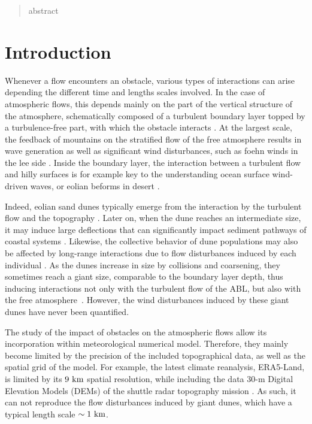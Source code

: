 \begin{abstract}
  abstract
\end{abstract}

\newpage

\section{Introduction}

Whenever a flow encounters an obstacle, various types of interactions can arise depending the different time and lengths scales involved. In the case of atmospheric flows, this depends mainly on the part of the vertical structure of the atmosphere, schematically composed of a turbulent boundary layer topped by a turbulence-free part, with which the obstacle interacts \citep{Stull1988}.
%
At the largest scale, the feedback of mountains on the stratified flow of the free atmosphere results in wave generation as well as significant wind disturbances, such as foehn winds in the lee side \citep{refs}. Inside the boundary layer, the interaction between a turbulent flow and hilly surfaces is for example key to the understanding ocean surface wind-driven waves, or eolian beforms in desert \citep{Belcher1998, Sullivan2010, Courrech2015}.

Indeed, eolian sand dunes typically emerge from the interaction by the turbulent flow and the topography \citep{Charru2013}. Later on, when the dune reaches an intermediate size, it may induce large deflections that can significantly impact sediment pathways of coastal systems \citep{Hesp2015}. Likewise, the collective behavior of dune populations may also be affected by long-range interactions due to flow disturbances induced by each individual \citep{Smith2017, Bacik2020}. As the dunes increase in size by collisions and coarsening, they sometimes reach a giant size, comparable to the boundary layer depth, thus inducing interactions not only with the turbulent flow of the ABL, but also with the free atmosphere~\citep{andreotti2009}. However, the wind disturbances induced by these giant dunes have never been quantified.

The study of the impact of obstacles on the atmospheric flows allow its incorporation within meteorological numerical model. Therefore, they mainly become limited by the precision of the included topographical data, as well as the spatial grid of the model. For example, the latest climate reanalysis, ERA5-Land, is limited by its $9~\textup{km}$ spatial resolution, while including the data $30$-m Digital Elevation Models (DEMs) of the shuttle radar topography mission \citep{Farr2007, munoz2021}. As such, it can not reproduce the flow disturbances induced by giant dunes, which have a typical length scale $\sim 1~\textup{km}$.

